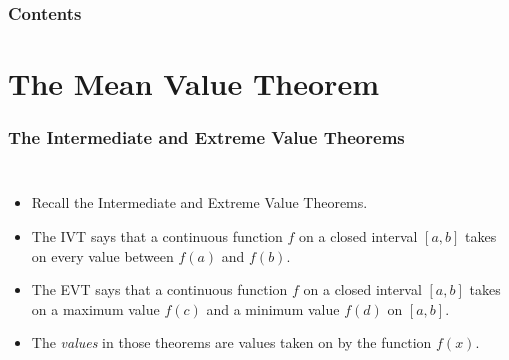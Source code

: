 \documentclass[serif,ignorenonframetext]{beamer}
\title{\commonTitleZeroThreeTwo}
\subtitle{\commonSubtitleZeroThreeTwo}
\author{\commonAuthor}
\institute{\commonInstitute}
\date{\commonDateZeroThreeTwo}
\begin{document}

\begin{frame}
  \titlepage
\end{frame}

\begin{frame}
  \frametitle{Contents}
  \tableofcontents
\end{frame}

\section{The Mean Value Theorem}

\begin{frame}
  \frametitle{The Intermediate and Extreme Value Theorems}
  \begin{columns}
  \begin{itemize}[<+->]
  \item Recall the Intermediate and Extreme Value Theorems.
  \item The IVT says that a continuous function $f$ on a closed interval
    $[a,b]$ takes on every value between $f(a)$ and $f(b)$.
  \item The EVT says that a continuous function $f$ on a closed interval
    $[a,b]$ takes on a maximum value $f(c)$ and a minimum value
    $f(d)$ on $[a,b]$.
  \item The \textit{values} in those theorems are values taken on by
    the function $f(x)$.
  \end{itemize}

\end{columns}
\end{frame}
\end{document}
